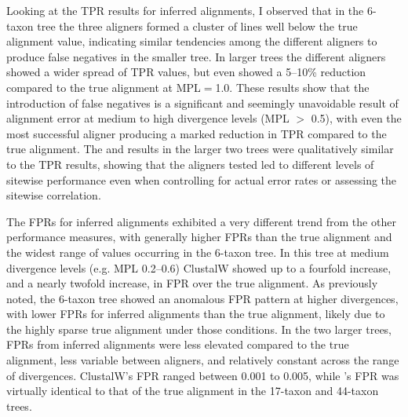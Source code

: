 Looking at the TPR results for inferred alignments, I observed that
in the 6-taxon tree the three aligners formed a cluster of lines well
below the true alignment value, indicating similar tendencies among
the different aligners to produce false negatives in the smaller
tree. In larger trees the different aligners showed a wider spread of
TPR values, but even \prankc{} showed a 5--10\% reduction compared to
the true alignment at MPL$=$1.0. These results show that the
introduction of false negatives is a significant and seemingly
unavoidable result of alignment error at medium to high divergence
levels (MPL $>$ 0.5), with even the most successful aligner producing
a marked reduction in TPR compared to the true alignment. The \tpr and
\omg results in the larger two trees were qualitatively similar to
the TPR results, showing that the aligners tested led to different
levels of sitewise performance even when controlling for actual error
rates or assessing the sitewise \omg correlation.

The FPRs for inferred alignments exhibited a very different trend from
the other performance measures, with generally higher FPRs than the
true alignment and the widest range of values occurring in the 6-taxon
tree. In this tree at medium divergence levels (e.g. MPL 0.2--0.6)
ClustalW showed up to a fourfold increase, and \prankc{} a nearly
twofold increase, in FPR over the true alignment. As previously noted,
the 6-taxon tree showed an anomalous FPR pattern at higher
divergences, with lower FPRs for inferred alignments than the true
alignment, likely due to the highly sparse true alignment under those
conditions. In the two larger trees, FPRs from inferred alignments
were less elevated compared to the true alignment, less variable
between aligners, and relatively constant across the range of
divergences. ClustalW's FPR ranged between 0.001 to 0.005, while
\prankc{}'s FPR was virtually identical to that of the true alignment in the
17-taxon and 44-taxon trees.

